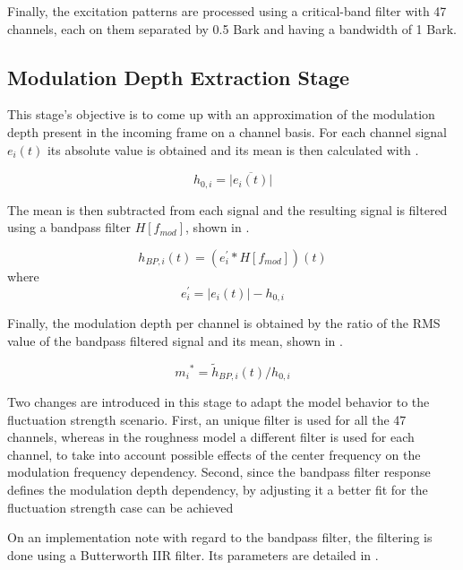 \documentclass[../main.tex]{subfiles}
\begin{document}
\begin{modelchapter}
Finally, the excitation patterns are processed using a critical-band filter with
47 channels, each on them separated by 0.5 Bark and having a bandwidth of 1
Bark.

\subsection{Modulation Depth Extraction Stage}

This stage's objective is to come up with an approximation of the modulation
depth present in the incoming frame on a channel basis. For each channel signal
$e_{i}(t)$ its absolute value is obtained and its mean is then calculated with
.

\begin{equation}
  h_{0,i} = \overline{|e_{i}(t)|}
  \label{eq:h0i}
\end{equation}

The mean is then subtracted from each signal and the resulting signal is
filtered using a bandpass filter $H[f_{mod}]$, shown in .

\begin{equation}
  h_{BP,i}(t) = (e_{i}^{\prime} * H[f_{mod}])(t)
  \label{eq:hBPi}
\end{equation}
where
\begin{equation}
  e_{i}^{\prime} = |e_{i}(t)| - h_{0,i}
\end{equation}

Finally, the modulation depth per channel is obtained by the ratio of the
\gls{RMS} value of the bandpass filtered signal and its mean, shown in
.

\begin{equation}
  {m_i}^* = \tilde{h}_{BP,i}(t)/h_{0,i}
  \label{eq:mi*}
\end{equation}

Two changes are introduced in this stage to adapt the model behavior to the
fluctuation strength scenario. First, an unique filter is used for all the 47
channels, whereas in the roughness model a different filter is used for each
channel, to take into account possible effects of the center frequency on the
modulation frequency dependency. Second, since the bandpass filter response
defines the modulation depth dependency, by adjusting it a better fit for the
fluctuation strength case can be achieved

On an implementation note with regard to the bandpass filter, the filtering is
done using a Butterworth \gls{IIR} filter. Its parameters are detailed in
.


\end{modelchapter}
\end{document}
